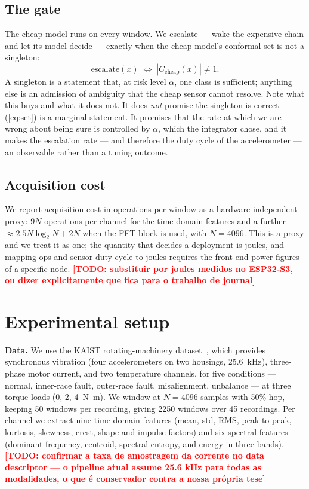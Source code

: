 \documentclass[conference,10pt]{IEEEtran}          %
\newcommand{\TODO}[1]{\textcolor{red}{\textbf{[TODO: #1]}}}
\begin{document}
\subsection{The gate}
The cheap model runs on every window. We escalate --- wake the expensive
chain and let its model decide --- exactly when the cheap model's
conformal set is not a singleton:
\begin{equation}
\text{escalate}(x) \;\Longleftrightarrow\; |C_{\mathrm{cheap}}(x)| \neq 1 .
\label{eq:gate}
\end{equation}
A singleton is a statement that, at risk level $\alpha$, one class is
sufficient; anything else is an admission of ambiguity that the cheap
sensor cannot resolve. Note what this buys and what it does not. It does
\emph{not} promise the singleton is correct --- (\ref{eq:set}) is a
marginal statement. It promises that the rate at which we are wrong about
being sure is controlled by $\alpha$, which the integrator chose, and it
makes the escalation rate --- and therefore the duty cycle of the
accelerometer --- an observable rather than a tuning outcome.

\subsection{Acquisition cost}
We report acquisition cost in operations per window as a
hardware-independent proxy: $9N$ operations per channel for the
time-domain features and a further $\approx 2.5 N \log_2 N + 2N$ when the
FFT block is used, with $N = 4096$. This is a proxy and we treat it as
one; the quantity that decides a deployment is joules, and mapping ops and
sensor duty cycle to joules requires the front-end power figures of a
specific node. \TODO{substituir por joules medidos no ESP32-S3, ou dizer
explicitamente que fica para o trabalho de journal}

\section{Experimental setup}

\textbf{Data.} We use the KAIST rotating-machinery
dataset~\cite{kaist}, which provides synchronous vibration (four
accelerometers on two housings, \SI{25.6}{\kilo\hertz}), three-phase motor
current, and two temperature channels, for five conditions --- normal,
inner-race fault, outer-race fault, misalignment, unbalance --- at three
torque loads (0, 2, \SI{4}{\newton\meter}). We window at $N=4096$ samples
with 50\% hop, keeping 50 windows per recording, giving 2250 windows over
45 recordings. Per channel we extract nine time-domain features (mean,
std, RMS, peak-to-peak, kurtosis, skewness, crest, shape and impulse
factors) and six spectral features (dominant frequency, centroid, spectral
entropy, and energy in three bands).
\TODO{confirmar a taxa de amostragem da corrente no data descriptor ---
o pipeline atual assume 25.6 kHz para todas as modalidades, o que é
conservador contra a nossa própria tese}
\end{document}
